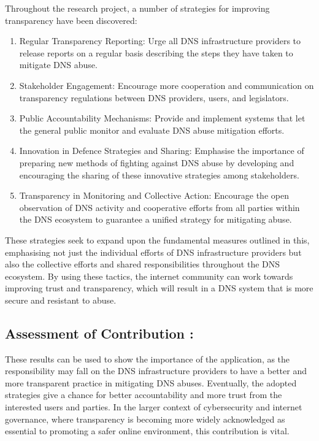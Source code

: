 Throughout the research project, a number of strategies for improving transparency have been discovered:


\begin{enumerate}

    \item Regular Transparency Reporting: Urge all DNS infrastructure providers to release reports on a regular basis describing the steps they have taken to mitigate DNS abuse.

    \item Stakeholder Engagement: Encourage more cooperation and communication on transparency regulations between DNS providers, users, and legislators.

    \item Public Accountability Mechanisms: Provide and implement systems that let the general public monitor and evaluate DNS abuse mitigation efforts.
    
    \item Innovation in Defence Strategies and Sharing: Emphasise the importance of preparing new methods of fighting against DNS abuse by developing and encouraging the sharing of these innovative strategies among stakeholders.
    
    \item Transparency in Monitoring and Collective Action: Encourage the open observation of DNS activity and cooperative efforts from all parties within the DNS ecosystem to guarantee a unified strategy for mitigating abuse.
    
\end{enumerate}

These strategies seek to expand upon the fundamental measures outlined in this, emphasising not just the individual efforts of DNS infrastructure providers but also the collective efforts and shared responsibilities throughout the DNS ecosystem. By using these tactics, the internet community can work towards improving trust and transparency, which will result in a DNS system that is more secure and resistant to abuse.


\subsection{Assessment of Contribution :}

These results can be used to show the importance of the application, as the responsibility may fall on the DNS infrastructure providers to have a better and more transparent practice in mitigating DNS abuses. Eventually, the adopted strategies give a chance for better accountability and more trust from the interested users and parties. In the larger context of cybersecurity and internet governance, where transparency is becoming more widely acknowledged as essential to promoting a safer online environment, this contribution is vital.


